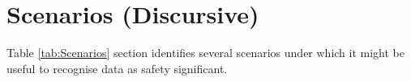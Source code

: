 %
%
\chapter{Scenarios (Discursive)} \label{bkm:scenario}


Table \ref{tab:Scenarios} section identifies several scenarios under which it might be useful to recognise data as safety significant.

